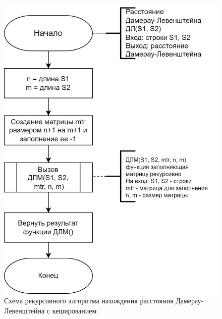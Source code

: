 \begin{figure}[h]
	\centering
	\includegraphics[height=0.6\textheight]{img/dlrechash-1.png}
	\caption{Схема рекурсивного алгоритма нахождения расстояния Дамерау-Левенштейна с кешированием}
	\label{fig:DLrechash1}
\end{figure}

\clearpage

